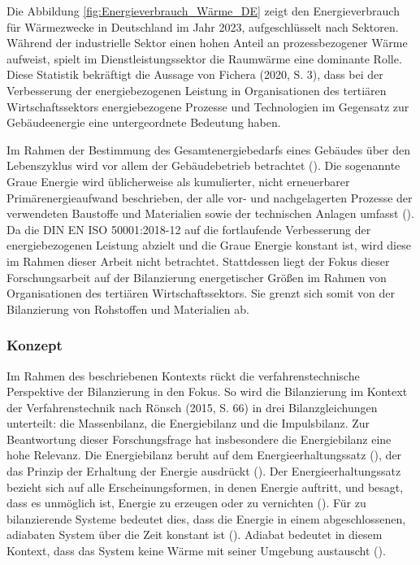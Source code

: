 Die Abbildung \ref{fig:Energieverbrauch_Wärme_DE} zeigt den Energieverbrauch für Wärmezwecke in Deutschland im Jahr 2023, aufgeschlüsselt nach Sektoren. 
Während der industrielle Sektor einen hohen Anteil an prozessbezogener Wärme aufweist, 
spielt im Dienstleistungssektor die Raumwärme eine dominante Rolle.
Diese Statistik bekräftigt die Aussage von Fichera (2020, S. 3), dass bei der Verbesserung der energiebezogenen Leistung in Organisationen des tertiären 
Wirtschaftssektors energiebezogene Prozesse und Technologien im Gegensatz zur Gebäudeenergie eine untergeordnete Bedeutung haben.

Im Rahmen der Bestimmung des Gesamtenergiebedarfs eines Gebäudes über den Lebenszyklus wird vor allem der Gebäudebetrieb betrachtet (\cite[S. 133]{Musall.2015}).
Die sogenannte Graue Energie wird üblicherweise als kumulierter, nicht erneuerbarer Primärenergieaufwand beschrieben, der alle vor- und nachgelagerten Prozesse 
der verwendeten Baustoffe und Materialien sowie der technischen Anlagen umfasst (\cite[S. 133]{Musall.2015}). Da die DIN EN ISO 50001:2018-12 auf die fortlaufende 
Verbesserung der energiebezogenen Leistung abzielt und die Graue Energie konstant ist, wird diese im Rahmen dieser Arbeit nicht betrachtet.
Stattdessen liegt der Fokus dieser Forschungsarbeit auf der Bilanzierung energetischer Größen im Rahmen von Organisationen des tertiären Wirtschaftssektors. 
Sie grenzt sich somit von der Bilanzierung von Rohstoffen und Materialien ab.


\subsubsection{Konzept}
Im Rahmen des beschriebenen Kontexts rückt die verfahrenstechnische Perspektive der Bilanzierung in den Fokus. 
So wird die Bilanzierung im Kontext der Verfahrenstechnik nach Rönsch (2015, S. 66) in drei Bilanzgleichungen unterteilt: die Massenbilanz, 
die Energiebilanz und die Impulsbilanz.
Zur Beantwortung dieser Forschungsfrage hat insbesondere die Energiebilanz eine hohe Relevanz.
Die Energiebilanz beruht auf dem Energieerhaltungssatz (\cite[S. 66]{Rönsch.2015}), der das Prinzip der Erhaltung der Energie ausdrückt 
(\cite[S. 57]{Baehr.1966}). Der Energieerhaltungssatz bezieht sich auf alle Erscheinungsformen, in denen Energie auftritt, und besagt, dass es 
unmöglich ist, Energie zu erzeugen oder zu vernichten (\cite[S. 57]{Baehr.1966}).
Für zu bilanzierende Systeme bedeutet dies, dass die Energie in einem abgeschlossenen, adiabaten System über die Zeit konstant ist 
(\cite[S. 66]{Rönsch.2015}). Adiabat bedeutet in diesem Kontext, dass das System keine Wärme mit seiner Umgebung austauscht (\cite[S. 66]{Rönsch.2015}).

